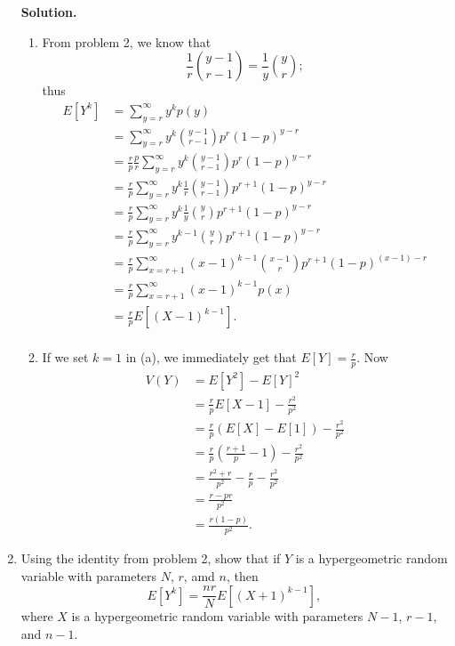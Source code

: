 \documentclass[9pt]{article}
\newcommand{\D}{\displaystyle}
\begin{document}
\begin{enumerate}
      \textbf{Solution.}

      \begin{enumerate}
         \item From problem 2, we know that 
               $$\frac{1}{r}\binom{y-1}{r-1} = \frac{1}{y}\binom{y}{r};$$
               thus
               \begin{align*}
                  E[Y^k] &= \sum_{y=r}^\infty y^kp(y) \\
                         &= \sum_{y=r}^\infty y^k \binom{y-1}{r-1}
                            p^r(1-p)^{y-r} \\
                         &= \frac{r}{p}\frac{p}{r}\sum_{y=r}^\infty
                            y^k \binom{y-1}{r-1} p^r(1-p)^{y-r} \\
                         &= \frac{r}{p}\sum_{y=r}^\infty
                            y^k\frac{1}{r}\binom{y-1}{r-1} p^{r+1}(1-p)^{y-r} \\
                         &= \frac{r}{p}\sum_{y=r}^\infty
                            y^k\frac{1}{y}\binom{y}{r} p^{r+1}(1-p)^{y-r} \\
                         &= \frac{r}{p}\sum_{y=r}^\infty
                            y^{k-1}\binom{y}{r} p^{r+1}(1-p)^{y-r} \\
                         &= \frac{r}{p}\sum_{x=r+1}^\infty
                            (x-1)^{k-1}\binom{x-1}{r} p^{r+1}(1-p)^{(x-1)-r} \\
                         &= \frac{r}{p}\sum_{x=r+1}^\infty (x-1)^{k-1}p(x) \\
                         &= \frac{r}{p}E[(X-1)^{k-1}]. \\
               \end{align*}
         \item If we set $k = 1$ in (a), we immediately get that
               $\D E[Y] = \frac{r}{p}$. Now
               \begin{align*}
                  V(Y) &= E[Y^2] - E[Y]^2 \\
                       &= \frac{r}{p}E[X-1] - \frac{r^2}{p^2} \\
                       &= \frac{r}{p}(E[X]- E[1]) - \frac{r^2}{p^2} \\
                       &= \frac{r}{p}\left(\frac{r + 1}{p}- 1\right) -
                          \frac{r^2}{p^2} \\
                       &= \frac{r^2 + r}{p^2}- \frac{r}{p} - \frac{r^2}{p^2} \\
                       &= \frac{r - pr}{p^2} \\
                       &= \frac{r(1 - p)}{p^2}.
               \end{align*}
      \end{enumerate}
   \item Using the identity from problem 2, show that if $Y$ is a hypergeometric
         random variable with parameters $N$, $r$, amd $n$, then
         $$E[Y^k] = \frac{nr}{N}E[(X+1)^{k-1}],$$
         where $X$ is a hypergeometric random variable with parameters $N - 1$,
         $r - 1$, and $n - 1$.


\end{enumerate}
\end{document}
